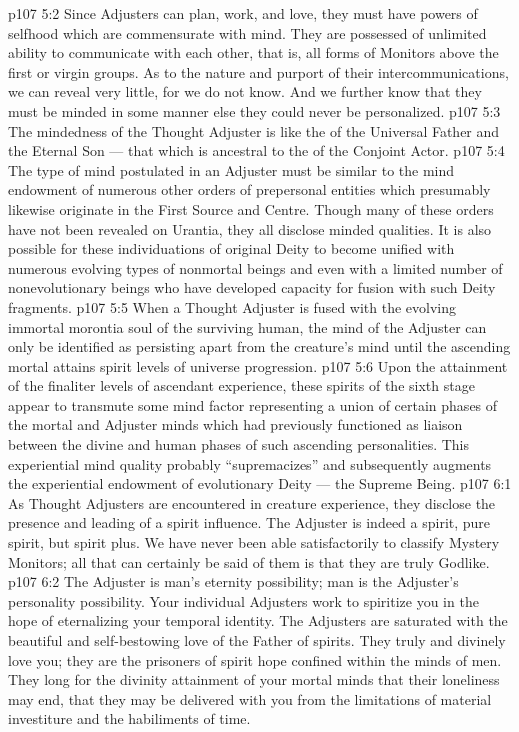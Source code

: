 \vs p107 5:2 Since Adjusters can plan, work, and love, they must have powers of selfhood which are commensurate with mind. They are possessed of unlimited ability to communicate with each other, that is, all forms of Monitors above the first or virgin groups. As to the nature and purport of their intercommunications, we can reveal very little, for we do not know. And we further know that they must be minded in some manner else they could never be personalized.
\vs p107 5:3 The mindedness of the Thought Adjuster is like the  of the Universal Father and the Eternal Son --- that which is ancestral to the  of the Conjoint Actor.
\vs p107 5:4 The type of mind postulated in an Adjuster must be similar to the mind endowment of numerous other orders of prepersonal entities which presumably likewise originate in the First Source and Centre. Though many of these orders have not been revealed on Urantia, they all disclose minded qualities. It is also possible for these individuations of original Deity to become unified with numerous evolving types of nonmortal beings and even with a limited number of nonevolutionary beings who have developed capacity for fusion with such Deity fragments.
\vs p107 5:5 When a Thought Adjuster is fused with the evolving immortal morontia soul of the surviving human, the mind of the Adjuster can only be identified as persisting apart from the creature’s mind until the ascending mortal attains spirit levels of universe progression.
\vs p107 5:6 Upon the attainment of the finaliter levels of ascendant experience, these spirits of the sixth stage appear to transmute some mind factor representing a union of certain phases of the mortal and Adjuster minds which had previously functioned as liaison between the divine and human phases of such ascending personalities. This experiential mind quality probably “supremacizes” and subsequently augments the experiential endowment of evolutionary Deity --- the Supreme Being.
\vs p107 6:1 As Thought Adjusters are encountered in creature experience, they disclose the presence and leading of a spirit influence. The Adjuster is indeed a spirit, pure spirit, but spirit plus. We have never been able satisfactorily to classify Mystery Monitors; all that can certainly be said of them is that they are truly Godlike.
\vs p107 6:2 The Adjuster is man’s eternity possibility; man is the Adjuster’s personality possibility. Your individual Adjusters work to spiritize you in the hope of eternalizing your temporal identity. The Adjusters are saturated with the beautiful and self\hyp{}bestowing love of the Father of spirits. They truly and divinely love you; they are the prisoners of spirit hope confined within the minds of men. They long for the divinity attainment of your mortal minds that their loneliness may end, that they may be delivered with you from the limitations of material investiture and the habiliments of time.
